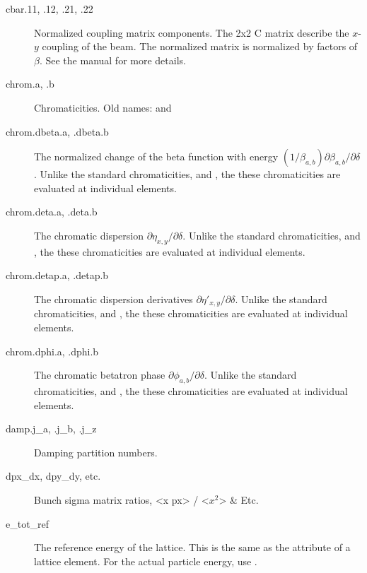 \begin{description}
  \item[cbar.11, .12, .21, .22] \Newline
Normalized coupling matrix components. The 2x2 C matrix describe the $x$-$y$ coupling of the beam.
The normalized matrix is normalized by factors of $\beta$. See the \bmad manual for more details.

  \item[chrom.a, .b] \Newline
Chromaticities. Old names:  and 

  \item[chrom.dbeta.a, .dbeta.b] \Newline
The normalized change of the beta function with energy
$(1/\beta_{a,b})\partial\beta_{a,b}/\partial\delta$. Unlike the standard chromaticities, and ,
the these chromaticities are evaluated at individual elements.

  \item[chrom.deta.a, .deta.b] \Newline
The chromatic dispersion $\partial\eta_{x,y}/\partial\delta$. Unlike the standard
chromaticities, and , the these chromaticities are evaluated at
individual elements.

  \item[chrom.detap.a, .detap.b] \Newline
The chromatic dispersion derivatives $\partial\eta'_{x,y}/\partial\delta$. Unlike the standard
chromaticities, and , the these chromaticities are evaluated at
individual elements.

  \item[chrom.dphi.a, .dphi.b] \Newline
The chromatic betatron phase $\partial\phi_{a,b}/\partial\delta$. Unlike the standard
chromaticities, and , the these chromaticities are evaluated at
individual elements.

  \item[damp.j_a, .j_b, .j_z] \Newline
Damping partition numbers.

  \item[dpx_dx, dpy_dy, etc.] \Newline
Bunch sigma matrix ratios, <x px> / <$x^2$> \& Etc.

  \item[e_tot_ref] \Newline
The reference energy of the lattice. This is the same as the  attribute of a lattice element.
For the actual particle energy, use .


\end{description}
